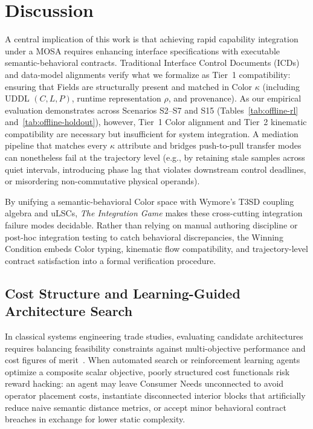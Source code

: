 \section{Discussion} \label{sec:discussion}

A central implication of this work is that achieving rapid capability integration under a MOSA requires enhancing interface specifications with executable semantic-behavioral contracts.  Traditional Interface Control Documents (ICDs) and data-model alignments verify what we formalize as Tier~1 compatibility: ensuring that Fields are structurally present and matched in Color $\kappa$ (including UDDL $(C, L, P)$, runtime representation $\rho$, and provenance).  As our empirical evaluation demonstrates across Scenarios S2--S7 and S15 (Tables~\ref{tab:offline-rl} and~\ref{tab:offline-holdout}), however, Tier~1 Color alignment and Tier~2 kinematic compatibility are necessary but insufficient for system integration.  A mediation pipeline that matches every $\kappa$ attribute and bridges push-to-pull transfer modes can nonetheless fail at the trajectory level (e.g., by retaining stale samples across quiet intervals, introducing phase lag that violates downstream control deadlines, or misordering non-commutative physical operands).

By unifying a semantic-behavioral Color space with Wymore's T3SD coupling algebra and uLSCs, \emph{The Integration Game} makes these cross-cutting integration failure modes decidable.  Rather than relying on manual authoring discipline or post-hoc integration testing to catch behavioral discrepancies, the Winning Condition embeds Color typing, kinematic flow compatibility, and trajectory-level contract satisfaction into a formal verification procedure.

\subsection{Cost Structure and Learning-Guided Architecture Search} \label{sec:disc-cost}

In classical systems engineering trade studies, evaluating candidate architectures requires balancing feasibility constraints against multi-objective performance and cost figures of merit~\cite{Wymore1993}.  When automated search or reinforcement learning agents optimize a composite scalar objective, poorly structured cost functionals risk reward hacking: an agent may leave Consumer Needs unconnected to avoid operator placement costs, instantiate disconnected interior blocks that artificially reduce naive semantic distance metrics, or accept minor behavioral contract breaches in exchange for lower static complexity.


